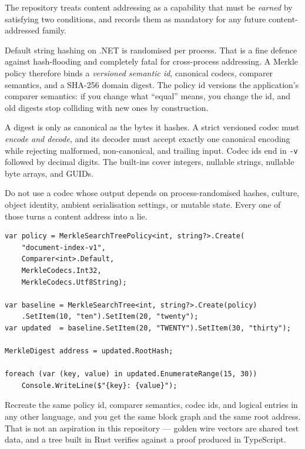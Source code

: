 \documentclass[11pt,twoside,openright]{book}
\newcommand{\code}[1]{\texorpdfstring{\textcolor{d7ink}{\texttt{#1}}}{#1}}
\begin{document}
The repository treats content addressing as a capability that must be
\emph{earned} by satisfying two conditions, and records them as mandatory for
any future content-addressed family.

\begin{contractbox}
Default string hashing on .NET is randomised per process. That is a fine defence
against hash-flooding and completely fatal for cross-process addressing. A
Merkle policy therefore binds a \emph{versioned semantic id}, canonical codecs,
comparer semantics, and a SHA-256 domain digest. The policy id versions the
application's comparer semantics: if you change what ``equal'' means, you change
the id, and old digests stop colliding with new ones by construction.
\end{contractbox}

\begin{contractbox}
A digest is only as canonical as the bytes it hashes. A strict versioned codec
must \emph{encode and decode}, and its decoder must accept exactly one canonical
encoding while rejecting malformed, non-canonical, and trailing input. Codec ids
end in \code{-v} followed by decimal digits. The built-ins cover integers,
nullable strings, nullable byte arrays, and GUIDs.

Do not use a codec whose output depends on process-randomised hashes, culture,
object identity, ambient serialisation settings, or mutable state. Every one of
those turns a content address into a lie.
\end{contractbox}

\begin{lstlisting}[language={[Sharp]C}]
var policy = MerkleSearchTreePolicy<int, string?>.Create(
    "document-index-v1",
    Comparer<int>.Default,
    MerkleCodecs.Int32,
    MerkleCodecs.Utf8String);

var baseline = MerkleSearchTree<int, string?>.Create(policy)
    .SetItem(10, "ten").SetItem(20, "twenty");
var updated  = baseline.SetItem(20, "TWENTY").SetItem(30, "thirty");

MerkleDigest address = updated.RootHash;

foreach (var (key, value) in updated.EnumerateRange(15, 30))
    Console.WriteLine($"{key}: {value}");
\end{lstlisting}

Recreate the same policy id, comparer semantics, codec ids, and logical entries
in any other language, and you get the same block graph and the same root
address. That is not an aspiration in this repository --- golden wire vectors are
shared test data, and a tree built in Rust verifies against a proof produced in
TypeScript.
\end{document}
